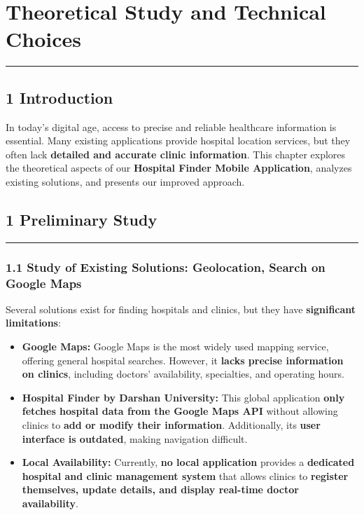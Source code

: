 \documentclass[12pt]{report}
\begin{document}
\newpage

\chapter{\textbf{Theoretical Study and Technical Choices}}
\rule{\linewidth}{1.5pt}

\section*{\textbf{1 Introduction}}


In today's digital age, access to precise and reliable healthcare information is essential. Many existing applications provide hospital location services, but they often lack \textbf{detailed and accurate clinic information}.
This chapter explores the theoretical aspects of our \textbf{Hospital Finder Mobile Application}, analyzes existing solutions, and presents our improved approach.

\section*{\textbf{1 Preliminary Study}}

\vspace{-0.5cm}
\rule{7.5cm}{1.5pt}
\vspace{-0.5cm}
\subsection*{\textbf{1.1 Study of Existing Solutions: Geolocation, Search on Google Maps}}

Several solutions exist for finding hospitals and clinics, but they have \textbf{significant limitations}:

\begin{itemize}
	\item \textbf{Google Maps:}
	      Google Maps is the most widely used mapping service, offering general hospital searches. However, it \textbf{lacks precise information on clinics}, including doctors' availability, specialties, and operating hours.
	\item \textbf{Hospital Finder by Darshan University:}
	      This global application \textbf{only fetches hospital data from the Google Maps API} without allowing clinics to \textbf{add or modify their information}. Additionally, its \textbf{user interface is outdated}, making navigation difficult.
	\item \textbf{Local Availability:}
	      Currently, \textbf{no local application} provides a \textbf{dedicated hospital and clinic management system} that allows clinics to \textbf{register themselves, update details, and display real-time doctor availability}.
\end{itemize}
\end{document}
